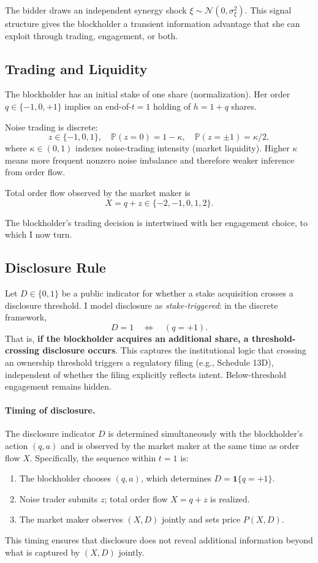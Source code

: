 \documentclass[11pt]{article}
\newcommand{\PP}{\mathbb{P}}
\newcommand{\1}{\mathbf{1}}
\begin{document}
The bidder draws an independent synergy shock $\xi \sim \mathcal{N}(0, \sigma_\xi^2)$. This signal structure gives the blockholder a transient information advantage that she can exploit through trading, engagement, or both.

%
\subsection{Trading and Liquidity}
%

The blockholder has an initial stake of one share (normalization). Her order $q \in \{-1, 0, +1\}$ implies an end-of-$t=1$ holding of $h = 1 + q$ shares.

Noise trading is discrete:
\[
z \in \{-1, 0, 1\}, \quad \PP(z = 0) = 1 - \kappa, \quad \PP(z = \pm 1) = \kappa/2,
\]
where $\kappa \in (0, 1)$ indexes noise-trading intensity (market liquidity). Higher $\kappa$ means more frequent nonzero noise imbalance and therefore weaker inference from order flow.

Total order flow observed by the market maker is
\[
X = q + z \in \{-2, -1, 0, 1, 2\}.
\]

The blockholder's trading decision is intertwined with her engagement choice, to which I now turn.

%
\subsection{Disclosure Rule}
%

Let $D \in \{0, 1\}$ be a public indicator for whether a stake acquisition crosses a disclosure threshold. I model disclosure as \emph{stake-triggered}: in the discrete framework,
\[
D = 1 \quad \Longleftrightarrow \quad (q = +1).
\]
That is, \textbf{if the blockholder acquires an additional share, a threshold-crossing disclosure occurs}. This captures the institutional logic that crossing an ownership threshold triggers a regulatory filing (e.g., Schedule 13D), independent of whether the filing explicitly reflects intent. Below-threshold engagement remains hidden.

\paragraph{Timing of disclosure.} The disclosure indicator $D$ is determined simultaneously with the blockholder's action $(q, a)$ and is observed by the market maker at the same time as order flow $X$. Specifically, the sequence within $t=1$ is:
\begin{enumerate}[label=(\roman*),leftmargin=2em,itemsep=0pt]
\item The blockholder chooses $(q, a)$, which determines $D = \1\{q=+1\}$.
\item Noise trader submits $z$; total order flow $X = q + z$ is realized.
\item The market maker observes $(X, D)$ jointly and sets price $P(X, D)$.
\end{enumerate}
This timing ensures that disclosure does not reveal additional information beyond what is captured by $(X, D)$ jointly.
\end{document}
